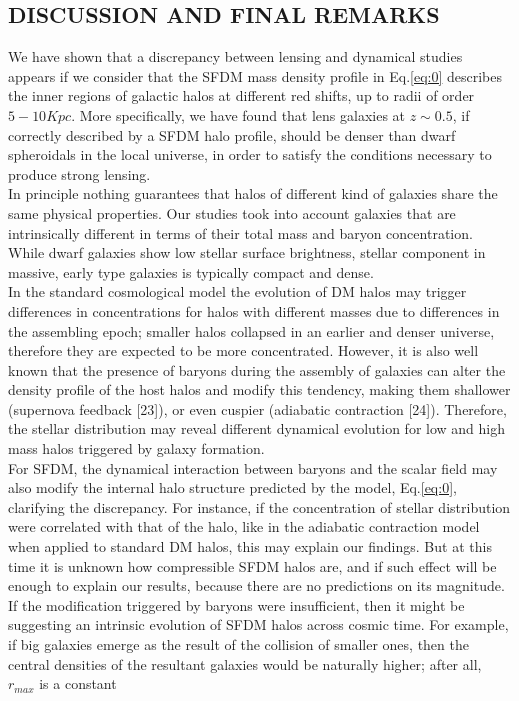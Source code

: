 \documentclass[letterpaper,10pt]{article}
\begin{document}
\begin{multicols}{2}
\section{DISCUSSION AND FINAL REMARKS}
\small{We have shown that a discrepancy between lensing and dynamical studies appears if we consider that the SFDM mass density profile in Eq.\eqref{eq:0} describes the inner regions of galactic halos at different red shifts, up to radii of order $5 -10 Kpc$. More specifically, we have found that lens galaxies at $z \sim 0.5$, if correctly described by a SFDM halo profile, should be denser than dwarf spheroidals in the local universe, in order to satisfy the conditions necessary to produce strong lensing.
\\
In principle nothing guarantees that halos of different kind of galaxies share the same physical properties. Our studies took into account galaxies that are intrinsically different in terms of their total mass and baryon concentration. While dwarf galaxies show low stellar surface brightness, stellar component in massive, early type galaxies is typically compact and dense.
\\
In the standard cosmological model the evolution of DM halos may trigger differences in concentrations for halos with different masses due to differences in the assembling epoch; smaller halos collapsed in an earlier and denser universe, therefore they are expected to be more concentrated. However, it is also well known that the presence of baryons during the assembly of galaxies can alter the density profile of the host halos and modify this tendency, making them shallower (supernova feedback [23]), or even cuspier (adiabatic contraction [24]). Therefore, the stellar distribution may reveal different dynamical evolution for low and high mass halos triggered by galaxy formation.
\\
For SFDM, the dynamical interaction between baryons and the scalar field may also modify the internal halo structure predicted by the model, Eq.\eqref{eq:0}, clarifying the discrepancy. For instance, if the concentration of stellar distribution were correlated with that of the halo, like in the adiabatic contraction model when applied to standard DM halos, this may explain our findings. But at this time it is unknown how compressible SFDM halos are, and if such effect will be enough to explain our results, because there are no predictions on its magnitude. If the modification triggered by baryons were insufficient, then it might be suggesting an intrinsic evolution of SFDM halos across cosmic time. For example, if big galaxies emerge as the result of the collision of smaller ones, then the central densities of the resultant galaxies would be naturally higher; after all, $r_{max}$ is a constant
}
\end{multicols}
\end{document}
